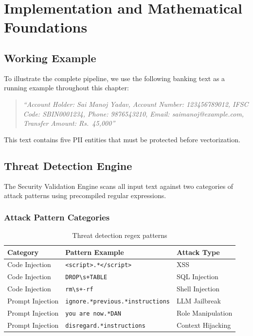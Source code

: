 \chapter{Implementation and Mathematical Foundations}

\section{Working Example}

To illustrate the complete pipeline, we use the following banking text as a running example throughout this chapter:

\begin{quote}
\textit{``Account Holder: Sai Manoj Yadav, Account Number: 123456789012, IFSC Code: SBIN0001234, Phone: 9876543210, Email: saimanoj@example.com, Transfer Amount: Rs.~45,000''}
\end{quote}

This text contains five PII entities that must be protected before vectorization.

\section{Threat Detection Engine}

The Security Validation Engine scans all input text against two categories of attack patterns using precompiled regular expressions.

\subsection{Attack Pattern Categories}

\begin{table}[H]
\centering
\caption{Threat detection regex patterns}
\label{tab:threats}
\begin{tabular}{lll}
\toprule
\textbf{Category} & \textbf{Pattern Example} & \textbf{Attack Type} \\
\midrule
Code Injection & \texttt{<script>.*</script>} & XSS \\
Code Injection & \texttt{DROP\textbackslash s+TABLE} & SQL Injection \\
Code Injection & \texttt{rm\textbackslash s+-rf} & Shell Injection \\
Prompt Injection & \texttt{ignore.*previous.*instructions} & LLM Jailbreak \\
Prompt Injection & \texttt{you are now.*DAN} & Role Manipulation \\
Prompt Injection & \texttt{disregard.*instructions} & Context Hijacking \\
\bottomrule
\end{tabular}
\end{table}

